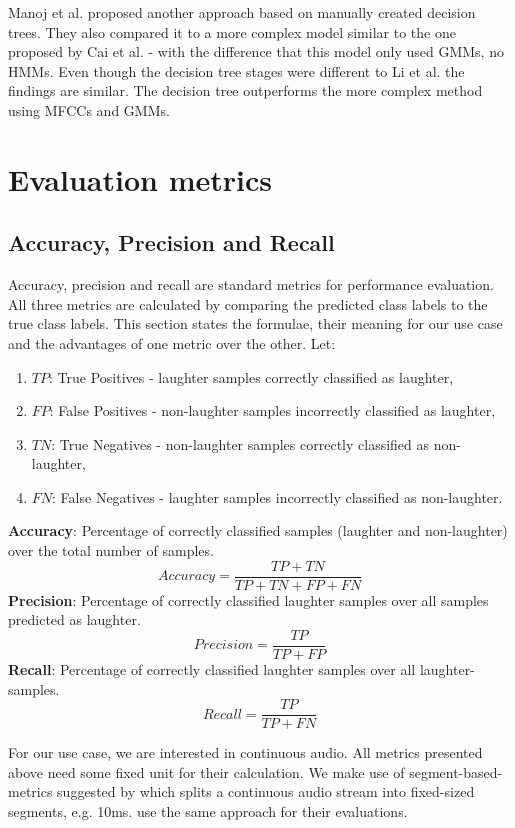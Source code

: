 \documentclass[bsc,frontabs,parskip,deptreport]{infthesis}
\begin{document}
Manoj et al. \citep{manoj2011novel} proposed another approach based on manually created decision trees. They also compared it to a more complex model similar to the one proposed by Cai et al. \citep{cai2003highlight} - with the difference that this model only used GMMs, no HMMs.
Even though the decision tree stages were different to Li et al. \citep{li2009characteristics} the findings are similar. The decision tree outperforms the more complex method using MFCCs and GMMs.  

\section{Evaluation metrics} \label{theory}
\subsection{Accuracy, Precision and Recall} \label{sec:acc-prec-rec}
Accuracy, precision and recall are standard metrics for performance evaluation.
All three metrics are calculated by comparing the predicted class labels to the true class labels.
This section states the formulae, their meaning for our use case and the advantages of one metric over the other.
Let:
\begin{enumerate}
    \item $TP$: True Positives - laughter samples correctly classified as laughter,
    \item $FP$: False Positives - non-laughter samples incorrectly classified as laughter,
    \item $TN$: True Negatives - non-laughter samples correctly classified as non-laughter,
    \item $FN$: False Negatives - laughter samples incorrectly classified as non-laughter.
\end{enumerate}
\textbf{Accuracy}: Percentage of correctly classified samples (laughter and non-laughter) over the total number of samples.
$$Accuracy = \frac{TP+TN}{TP+TN+FP+FN}$$
\textbf{Precision}: Percentage of correctly classified laughter samples over all samples predicted as laughter.
$$Precision = \frac{TP}{TP+FP}$$
\textbf{Recall}: Percentage of correctly classified laughter samples over all laughter-samples.
$$Recall = \frac{TP}{TP+FN}$$

For our use case, we are interested in continuous audio. All metrics presented above need some fixed unit for their calculation. We make use of segment-based-metrics suggested by \citep{mesaros2016metrics} which splits a continuous audio stream into fixed-sized segments, e.g. 10ms. \citet{gillick2021robust} use the same approach for their evaluations.
\end{document}
